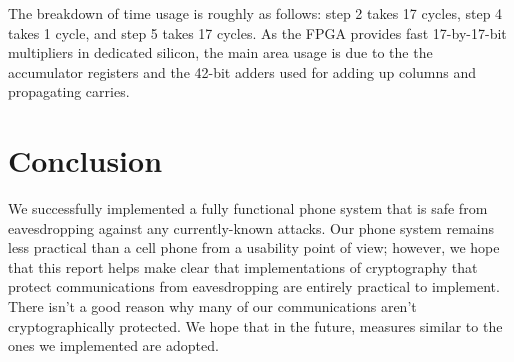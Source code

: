 \documentclass[a4paper]{report}
\begin{document}
The breakdown of time usage is roughly as follows: step 2 takes 17 cycles, step
4 takes 1 cycle, and step 5 takes 17 cycles. As the FPGA provides fast
17-by-17-bit multipliers in dedicated silicon, the main area usage is due to the
the accumulator registers and the 42-bit adders used for adding up columns and
propagating carries.



\section{Conclusion}

We successfully implemented a fully functional phone system that is safe from eavesdropping against any currently-known attacks. Our phone system remains less practical than a cell phone from a usability point of view; however, we hope that this report helps make clear that implementations of cryptography that protect communications from eavesdropping are entirely practical to implement. There isn't a good reason why many of our communications aren't cryptographically protected. We hope that in the future, measures similar to the ones we implemented are adopted.




\end{document}
